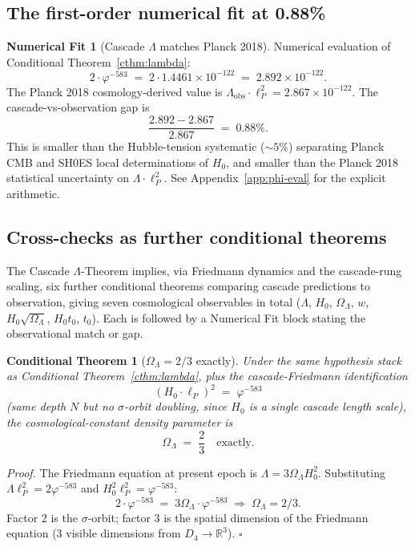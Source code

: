\documentclass[11pt]{article}
\theoremstyle{plain}
\newtheorem{conditional}[theorem]{Conditional Theorem}
\theoremstyle{definition}
\newtheorem{numfit}[theorem]{Numerical Fit}
\theoremstyle{remark}
\begin{document}
\subsection{The first-order numerical fit at 0.88\%}\label{sec:numfit-088}

\begin{numfit}[Cascade $\Lambda$ matches Planck 2018]\label{nf:lambda}
Numerical evaluation of Conditional Theorem~\ref{cthm:lambda}:
\[
  2 \cdot \varphi^{-583} \;=\; 2 \cdot 1.4461 \times 10^{-122} \;=\; 2.892 \times 10^{-122}.
\]
The Planck 2018 cosmology-derived value is $\Lambda_\mathrm{obs} \cdot \ell_P^2 = 2.867 \times 10^{-122}$. The cascade-vs-observation gap is
\[
  \frac{2.892 - 2.867}{2.867} \;=\; 0.88\%.
\]
This is smaller than the Hubble-tension systematic ($\sim 5\%$) separating Planck CMB and SH0ES local determinations of $H_0$, and smaller than the Planck 2018 statistical uncertainty on $\Lambda \cdot \ell_P^2$. See Appendix~\ref{app:phi-eval} for the explicit arithmetic.
\end{numfit}

\subsection{Cross-checks as further conditional theorems}\label{sec:lambda-crosschecks}

The Cascade $\Lambda$-Theorem implies, via Friedmann dynamics and the cascade-rung scaling, six further conditional theorems comparing cascade predictions to observation, giving seven cosmological observables in total ($\Lambda$, $H_0$, $\Omega_\Lambda$, $w$, $H_0\sqrt{\Omega_\Lambda}$, $H_0 t_0$, $t_0$). Each is followed by a Numerical Fit block stating the observational match or gap.

\begin{conditional}[$\Omega_\Lambda = 2/3$ exactly]\label{cthm:omega}
Under the same hypothesis stack as Conditional Theorem~\ref{cthm:lambda}, plus the cascade-Friedmann identification
\[
  (H_0 \cdot \ell_P)^2 \;=\; \varphi^{-583}
\]
(same depth $N$ but no $\sigma$-orbit doubling, since $H_0$ is a single cascade length scale), the cosmological-constant density parameter is
\[
  \Omega_\Lambda \;=\; \frac{2}{3} \quad\text{exactly.}
\]
\end{conditional}

\noindent\emph{Proof.} The Friedmann equation at present epoch is $\Lambda = 3 \Omega_\Lambda H_0^2$. Substituting $\Lambda \ell_P^2 = 2\varphi^{-583}$ and $H_0^2 \ell_P^2 = \varphi^{-583}$:
\[
  2 \cdot \varphi^{-583} \;=\; 3 \Omega_\Lambda \cdot \varphi^{-583} \;\Rightarrow\; \Omega_\Lambda = 2/3.
\]
Factor 2 is the $\sigma$-orbit; factor 3 is the spatial dimension of the Friedmann equation (3 visible dimensions from $D_4 \to \mathbb{R}^3$). \hfill$\square$
\end{document}
